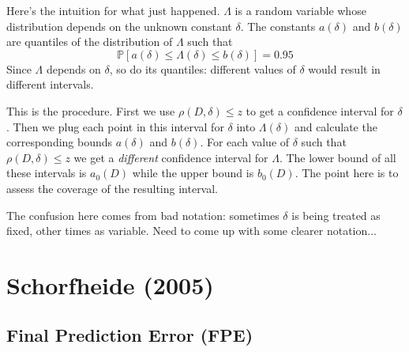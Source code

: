 \documentclass[12pt]{article}
\theoremstyle{definition}
\newcommand{\p}{\mathbb{P}}
\begin{document}
Here's the intuition for what just happened. $\Lambda$ is a random variable whose distribution depends on the unknown constant $\delta$. The constants $a(\delta)$ and $b(\delta)$ are quantiles of the distribution of $\Lambda$ such that 
	$$\p\left[ a(\delta) \leq \Lambda(\delta) \leq b(\delta)\right] = 0.95$$
Since $\Lambda$ depends on $\delta$, so do its quantiles: different values of $\delta$ would result in different intervals. 

This is the procedure. First we use $\rho(D,\delta)\leq z$ to get a confidence interval for $\delta$. Then we plug each point in this interval for $\delta$ into $\Lambda(\delta)$ and calculate the corresponding bounds $a(\delta)$ and $b(\delta)$. For each value of $\delta$ such that $\rho(D,\delta)\leq z$ we get a \emph{different} confidence interval for $\Lambda$. The lower bound of all these intervals is $a_0(D)$ while the upper bound is $b_0(D)$. The point here is to assess the coverage of the resulting interval.

The confusion here comes from bad notation: sometimes $\delta$ is being treated as fixed, other times as variable. Need to come up with some clearer notation...















\section{Schorfheide (2005)}
\subsection{Final Prediction Error (FPE)}
\end{document}
